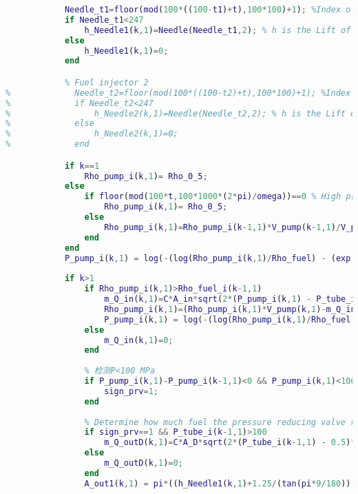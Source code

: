 \documentclass[withoutpreface,bwprint]{cumcmthesis} %
\begin{document}
\begin{appendices}
\begin{lstlisting}[language=matlab]
            % Fuel injector 1
            Needle_t1=floor(mod(100*((100-t1)+t),100*100)+1); %Index of time t in Needle data
            if Needle_t1<247
                h_Needle1(k,1)=Needle(Needle_t1,2); % h is the Lift of Needle.
            else
                h_Needle1(k,1)=0;
            end

            % Fuel injector 2
%             Needle_t2=floor(mod(100*((100-t2)+t),100*100)+1); %Index of time t in Needle data
%             if Needle_t2<247
%                 h_Needle2(k,1)=Needle(Needle_t2,2); % h is the Lift of Needle.
%             else
%                 h_Needle2(k,1)=0;
%             end

            if k==1
                Rho_pump_i(k,1)= Rho_0_5; 
            else
                if floor(mod(100*t,100*1000*(2*pi)/omega))==0 % High pressure oil pump replenishment operation.
                    Rho_pump_i(k,1)= Rho_0_5;
                else
                    Rho_pump_i(k,1)=Rho_pump_i(k-1,1)*V_pump(k-1,1)/V_pump(k,1); % Fuel density in the oil pump at the current time.
                end
            end
            P_pump_i(k,1) = log(-(log(Rho_pump_i(k,1)/Rho_fuel) - (exp(-0.39)/(0.0039*exp(7.31))))*0.0039*exp(7.31))*(-1/0.0039);
            
            if k>1 
                if Rho_pump_i(k,1)>Rho_fuel_i(k-1,1) 
                    m_Q_in(k,1)=C*A_in*sqrt(2*(P_pump_i(k,1) - P_tube_i(k-1,1))*Rho_pump_i(k,1))*b;
                    Rho_pump_i(k,1)=(Rho_pump_i(k,1)*V_pump(k,1)-m_Q_in(k,1))/V_pump(k,1);
                    P_pump_i(k,1) = log(-(log(Rho_pump_i(k,1)/Rho_fuel) - (exp(-0.39)/(0.0039*exp(7.31))))*0.0039*exp(7.31))*(-1/0.0039);
                else
                    m_Q_in(k,1)=0;
                end
                
                % 检测P<100 MPa
                if P_pump_i(k,1)-P_pump_i(k-1,1)<0 && P_pump_i(k,1)<100 && sign_prv==0
                    sign_prv=1;
                end
                
                % Determine how much fuel the pressure reducing valve releases according to sign_prv
                if sign_prv==1 && P_tube_i(k-1,1)>100
                    m_Q_outD(k,1)=C*A_D*sqrt(2*(P_tube_i(k-1,1) - 0.5)*Rho_fuel_i(k-1,1))*b;
                else
                    m_Q_outD(k,1)=0;
                end
                A_out1(k,1) = pi*((h_Needle1(k,1)+1.25/(tan(pi*9/180)))*tan(pi*9/180))^2-pi*1.25^2;


\end{lstlisting}
\end{appendices}
\end{document}
